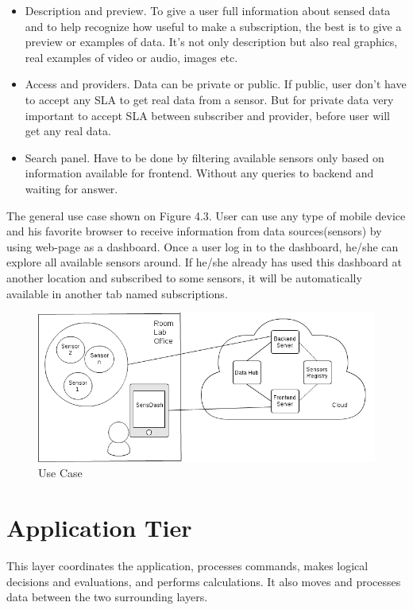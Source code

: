 \begin{itemize}
      \item Description and preview. To give a user full information about sensed data and to help recognize how useful to make a subscription, the best is to give a preview or examples of data. It's not only description but also real graphics, real examples of video or audio, images etc.
      \item Access and providers. Data can be private or public. If public, user don't have to accept any SLA to get real data from a sensor. But for private data very important to accept SLA between subscriber and provider, before user will get any real data.
      \item Search panel. Have to be done by filtering available sensors only based on information available for frontend. Without any queries to backend and waiting for answer.
      \end{itemize}

    The general use case shown on Figure 4.3. User can use any type of mobile device and his favorite browser to receive information from data sources(sensors) by using web-page as a dashboard. Once a user log in to the dashboard, he/she can explore all available sensors around. If he/she already has used this dashboard at another location and subscribed to some sensors, it will be automatically available in another tab named subscriptions. 

        \begin{figure}[!ht]
        \centering
        \includegraphics[scale=0.6]{images/User_Case.png}   
        \caption[Use Case]{Use Case}                        
        \end{figure}

\section{Application Tier}
  This layer coordinates the application, processes commands, makes logical decisions and evaluations, and performs calculations. It also moves and processes data between the two surrounding layers.

